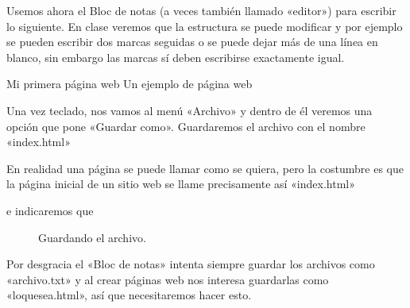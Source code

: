 \documentclass[a4paper,12pt,spanish]{sphinxmanual}
\begin{document}
Usemos ahora el Bloc de notas (a veces también llamado «editor») para escribir lo siguiente. En clase veremos que la estructura se puede modificar y por ejemplo se pueden escribir dos marcas seguidas o se puede dejar más de una línea en blanco, sin embargo las marcas sí deben escribirse exactamente igual.

%
\begin{sphinxVerbatim}[commandchars=\\\{\}]
      
         Mi primera página web
     Un ejemplo de página web
\end{sphinxVerbatim}

Una vez teclado, nos vamos al menú «Archivo» y dentro de él veremos una opción que pone «Guardar como». Guardaremos el archivo con el nombre «index.html» %
\begin{footnote}[1]\sphinxAtStartFootnote
En realidad una página se puede llamar como se quiera, pero la costumbre es que la página inicial de un sitio web se llame precisamente así «index.html»
%
\end{footnote} e indicaremos que 

\begin{figure}[htbp]
\centering
\capstart

\noindent{}
\caption{Guardando el archivo.}\label{\detokenize{index:id6}}\end{figure}

Por desgracia el «Bloc de notas» intenta siempre guardar los archivos como «archivo.txt» y al crear páginas web nos interesa guardarlas como «loquesea.html», así que necesitaremos hacer esto.
\end{document}

